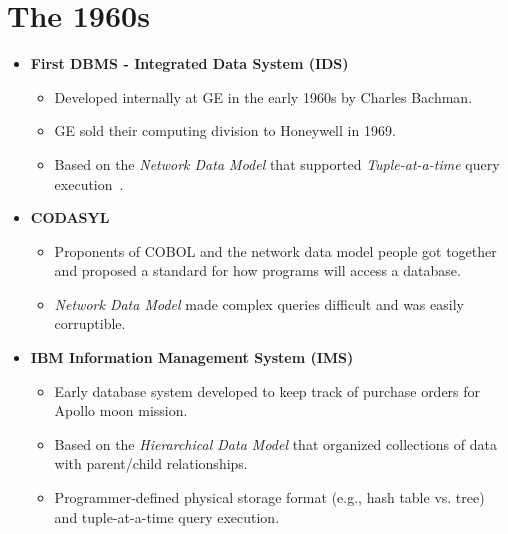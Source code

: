 \documentclass[11pt]{article}
\begin{document}
\section{The 1960s}
\begin{itemize}
    \item \textbf{First DBMS - Integrated Data System (IDS)}~\cite{bachman-interview,haigh16}
    \begin{itemize}
        \item
        Developed internally at GE in the early 1960s by Charles Bachman.
        
        \item
        GE sold their computing division to Honeywell in 1969.
        
        \item
        Based on the \textit{Network Data Model} that supported 
        \textit{Tuple-at-a-time} query execution~\cite{bachman66}.
    \end{itemize}
    
    \item \textbf{CODASYL}~\cite{taylor76}
    \begin{itemize}
        \item
        Proponents of COBOL and the network data model people got together and proposed a standard 
        for how programs will access a database.
        
        \item
        \textit{Network Data Model} made complex queries difficult and was easily corruptible.
    \end{itemize}
    
    \item \textbf{IBM Information Management System (IMS)}~\cite{klein12}
    \begin{itemize}
        \item
        Early database system developed to keep track of purchase orders for Apollo moon mission.
        
        \item
        Based on the \textit{Hierarchical Data Model} that organized collections of data with
        parent/child relationships.
        
        \item
        Programmer-defined physical storage format (e.g., hash table vs. tree) and tuple-at-a-time 
        query execution.
    \end{itemize}
\end{itemize}
\end{document}
